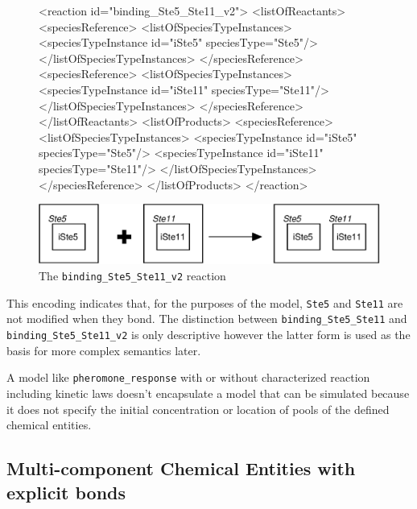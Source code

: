\documentclass{cekarticle}
\begin{document}
\begin{figure}[h]
\begin{example}
<reaction id="binding_Ste5_Ste11_v2">
    <listOfReactants>
        <speciesReference>
            <listOfSpeciesTypeInstances>
                <speciesTypeInstance id="iSte5" speciesType="Ste5"/>
            </listOfSpeciesTypeInstances>
        </speciesReference>
        <speciesReference>
            <listOfSpeciesTypeInstances>
                <speciesTypeInstance id="iSte11" speciesType="Ste11"/>
            </listOfSpeciesTypeInstances>
        </speciesReference>
    </listOfReactants>
    <listOfProducts>
        <speciesReference>
            <listOfSpeciesTypeInstances>
                <speciesTypeInstance id="iSte5" speciesType="Ste5"/>
                <speciesTypeInstance id="iSte11" speciesType="Ste11"/>
            </listOfSpeciesTypeInstances>
        </speciesReference>
    </listOfProducts>
</reaction>
\end{example}
  \vspace*{8pt}
  \centering
  \includegraphics[scale = 0.7]{binding_Ste5_Ste11_v2.eps}
  \caption{The \texttt{binding\_Ste5\_Ste11\_v2} reaction}
  \label{fig:binding_Ste5_Ste11_v2}
\end{figure}

This encoding indicates that, for the purposes of the model, \texttt{Ste5} and \texttt{Ste11}
are not modified when they bond.  The distinction between \texttt{binding\_Ste5\_Ste11}
and \texttt{binding\_Ste5\_Ste11\_v2} is only descriptive however the latter form
is used as the basis for more complex semantics later. 

A model like \texttt{pheromone\_response} with or without characterized reaction including kinetic laws
doesn't encapsulate a model that can be simulated because it does not specify the initial concentration
or location of pools of the defined chemical entities.

\subsection{Multi-component Chemical Entities with explicit bonds}
\label{sec:explicitbonds}
\end{document}
